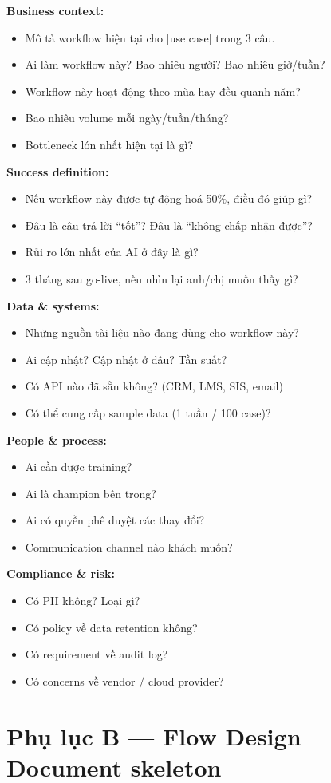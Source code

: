 \documentclass[11pt,a4paper]{article}
\begin{document}
\textbf{Business context:}
\begin{itemize}
\item Mô tả workflow hiện tại cho [use case] trong 3 câu.
\item Ai làm workflow này? Bao nhiêu người? Bao nhiêu giờ/tuần?
\item Workflow này hoạt động theo mùa hay đều quanh năm?
\item Bao nhiêu volume mỗi ngày/tuần/tháng?
\item Bottleneck lớn nhất hiện tại là gì?
\end{itemize}
\textbf{Success definition:}
\begin{itemize}
\item Nếu workflow này được tự động hoá 50\%, điều đó giúp gì?
\item Đâu là câu trả lời ``tốt''? Đâu là ``không chấp nhận được''?
\item Rủi ro lớn nhất của AI ở đây là gì?
\item 3 tháng sau go-live, nếu nhìn lại anh/chị muốn thấy gì?
\end{itemize}
\textbf{Data \& systems:}
\begin{itemize}
\item Những nguồn tài liệu nào đang dùng cho workflow này?
\item Ai cập nhật? Cập nhật ở đâu? Tần suất?
\item Có API nào đã sẵn không? (CRM, LMS, SIS, email)
\item Có thể cung cấp sample data (1 tuần / 100 case)?
\end{itemize}
\textbf{People \& process:}
\begin{itemize}
\item Ai cần được training?
\item Ai là champion bên trong?
\item Ai có quyền phê duyệt các thay đổi?
\item Communication channel nào khách muốn?
\end{itemize}
\textbf{Compliance \& risk:}
\begin{itemize}
\item Có PII không? Loại gì?
\item Có policy về data retention không?
\item Có requirement về audit log?
\item Có concerns về vendor / cloud provider?
\end{itemize}

\section*{Phụ lục B — Flow Design Document skeleton}
\end{document}
